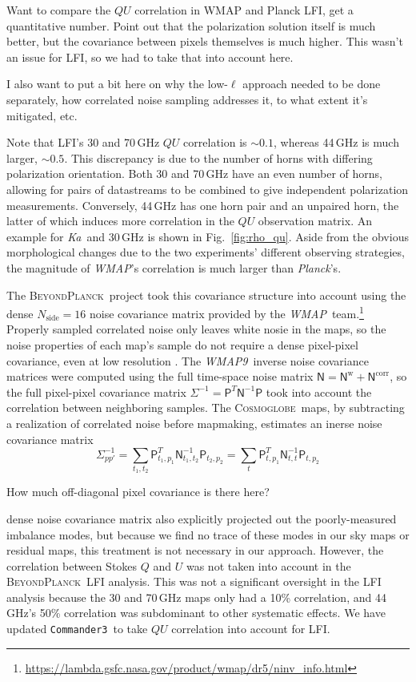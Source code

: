 \documentclass[twocolumn]{../../common/aa}
\def\WMAP{\emph{WMAP}}
\def\WMAPnine{\emph{WMAP9}}
\def\Planck{\emph{Planck}}
\def\commanderthree{\texttt{Commander3}}
\newcommand{\BP}{\textsc{BeyondPlanck}}
\newcommand{\cosmoglobe}{\textsc{Cosmoglobe}}
\newcommand{\Ka}[0]{\textit{Ka}}
\begin{document}
Want to compare the $QU$ correlation in WMAP and Planck LFI, get a quantitative number. Point out that the polarization solution itself is much better, but the covariance between pixels themselves is much higher. This wasn't an issue for LFI, so we had to take that into account here.

I also want to put a bit here on why the low-$\ell$ approach needed to be done separately, how correlated noise sampling addresses it, to what extent it's mitigated, etc.

Note that LFI's 30 and 70\,GHz $QU$ correlation is $\sim0.1$, whereas 44\,GHz is much larger, $\sim0.5$. This discrepancy is due to the number of horns with differing polarization orientation. Both 30 and 70\,GHz have an even number of horns, allowing for pairs of datastreams to be combined to give independent polarization measurements. Conversely, 44\,GHz has one horn pair and an unpaired horn, the latter of which induces more correlation in the $QU$ observation matrix. An example for \Ka\ and 30\,GHz is shown in Fig.~\ref{fig:rho_qu}. Aside from the obvious morphological changes due to the two experiments' different observing strategies, the magnitude of \WMAP's correlation is much larger than \Planck's.

The \BP\ project took this covariance structure into account using the dense $N_\mathrm{side}=16$ noise covariance matrix provided by the \WMAP\ team.\footnote{\url{https://lambda.gsfc.nasa.gov/product/wmap/dr5/ninv_info.html}} Properly sampled correlated noise only leaves white nosie in the maps, so the noise properties of each map's sample do not require a dense pixel-pixel covariance, even at low resolution \citep{bp01, bp10}. 
The \WMAPnine\ inverse noise covariance matrices were computed using the full time-space noise matrix $\mathsf N=\mathsf N^\mathrm w+\mathsf N^\mathrm{corr}$, so the full pixel-pixel covariance matrix $\Sigma^{-1}=\mathsf P^T\mathsf N^{-1}\mathsf P$ took into account the correlation between neighboring samples. The \cosmoglobe\ maps, by subtracting a realization of correlated noise before mapmaking, estimates an inerse noise covariance matrix
\begin{equation}
	\Sigma^{-1}_{pp'}
	=\sum_{t_1,t_2}\mathsf P_{t_1,p_1}^T\mathsf N_{t_1,t_2}^{-1}\mathsf P_{t_2,p_2}
	=\sum_t\mathsf P_{t,p_1}^T\mathsf N_{t,t}^{-1}\mathsf P_{t,p_2}
\end{equation}

How much off-diagonal pixel covariance is there here?

dense noise covariance matrix also explicitly projected out the poorly-measured imbalance modes, but because we find no trace of these modes in our sky maps or residual maps, this treatment is not necessary in our approach. However, the correlation between Stokes $Q$ and $U$ was not taken into account in the \BP\ LFI analysis. This was not a significant oversight in the LFI analysis because the 30 and 70\,GHz maps only had a 10\% correlation, and 44\,GHz's 50\% correlation was subdominant to other systematic effects. We have updated \commanderthree\ to take $QU$ correlation into account for LFI.
\end{document}
